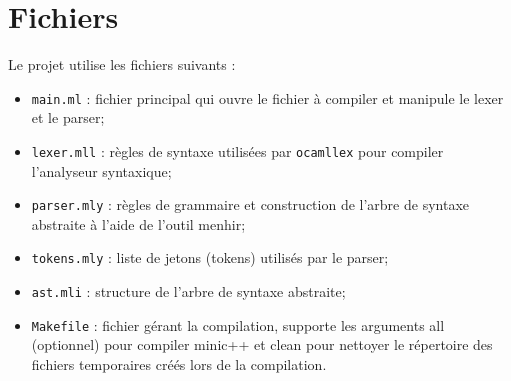 \documentclass{article}
\begin{document}
\section*{Fichiers}
Le projet utilise les fichiers suivants :
\begin{itemize}
  \item \texttt{main.ml} : fichier principal qui ouvre le fichier à
    compiler et manipule le lexer et le parser;
  \item \texttt{lexer.mll} : règles de syntaxe utilisées par \texttt{ocamllex} pour
    compiler l'analyseur syntaxique;
  \item \texttt{parser.mly} : règles de grammaire et construction de l'arbre de
    syntaxe abstraite à l'aide de l'outil menhir;
  \item \texttt{tokens.mly} : liste de jetons (tokens) utilisés par le parser;
  \item \texttt{ast.mli} : structure de l'arbre de syntaxe abstraite;
  \item \texttt{Makefile} : fichier gérant la compilation, supporte les
    arguments all (optionnel) pour compiler minic++ et clean pour
    nettoyer le répertoire des fichiers temporaires créés lors de la compilation.
\end{itemize}
  
\end{document}
